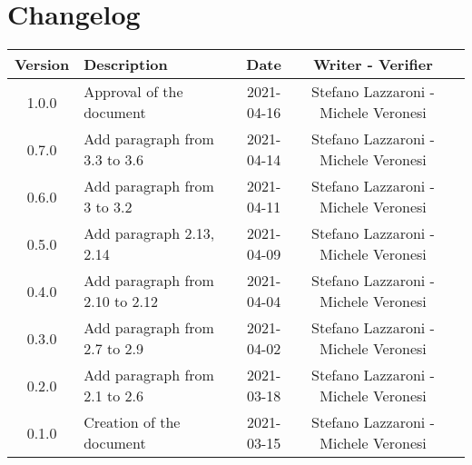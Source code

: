 \section*{Changelog}

\begin{center}
	\begin{longtable}{|c|p{5cm}|c|c|c|}
	\hline
	\rowcolor{lighter-grayer}
	\textbf{Version} & \textbf{Description} & \textbf{Date} & \textbf{Writer - Verifier} \\
	\hline
	\endfirsthead


	\hline
	1.0.0 & Approval of the document & 2021-04-16 & Stefano Lazzaroni - Michele Veronesi\\
	0.7.0 & Add paragraph from 3.3 to 3.6 & 2021-04-14 & Stefano Lazzaroni - Michele Veronesi\\
	0.6.0 & Add paragraph from 3 to 3.2 & 2021-04-11 & Stefano Lazzaroni - Michele Veronesi\\
	0.5.0 & Add paragraph 2.13, 2.14 & 2021-04-09 & Stefano Lazzaroni - Michele Veronesi\\
	0.4.0 & Add paragraph from 2.10 to 2.12 & 2021-04-04 & Stefano Lazzaroni - Michele Veronesi\\
	0.3.0 & Add paragraph from 2.7 to 2.9  & 2021-04-02 & Stefano Lazzaroni - Michele Veronesi\\
	0.2.0 & Add paragraph from 2.1 to 2.6 & 2021-03-18 & Stefano Lazzaroni - Michele Veronesi\\
	0.1.0 & Creation of the document & 2021-03-15 & Stefano Lazzaroni - Michele Veronesi\\
	\hline

	\end{longtable}
\end{center}